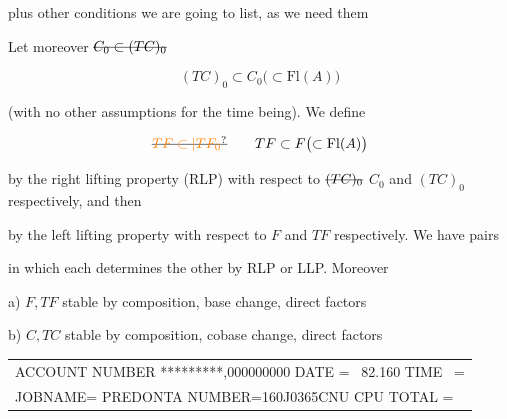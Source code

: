plus other conditions we are going to list, as we need them

 Let moreover $\deleted{C_0\subset(TC)_0}$

\[
(TC)_0\subset C_0\bigl(\subset\mathrm{Fl}(A)\bigr)
\]

(with no other assumptions for the time being). We define


\[
\deleted{\unsure{TF\subset|TF_0}}\qquad TF\subset F\bigl(\subset\mathrm{Fl}(A)\bigr)
\]

by the right lifting property (RLP) with respect to $\deleted{(TC)_0}$ $C_0$ and $(TC)_0$ respectively, and then


by the  left lifting property  with respect to $F$ and $TF$ respectively. We have pairs


in which each  determines the other by RLP  or LLP.  Moreover

a) $F,TF$ stable by composition, base change, direct factors

b) $C,TC$ stable by composition, cobase change, direct factors


{\scriptsize\ttfamily\begin{tabular}{@{}l@{}}
ACCOUNT NUMBER *********,000000000 \quad DATE = \ 82.160 \qquad TIME \ =\\
JOBNAME= PREDONTA \quad NUMBER=160J0365CNU \quad CPU TOTAL = \qquad 15
\end{tabular}}


